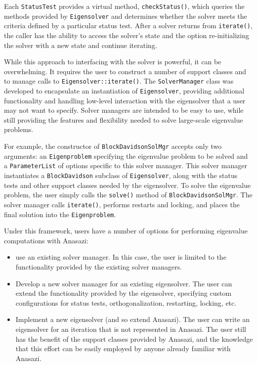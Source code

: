 \documentclass[acmtoms]{acmtrans2m}
\newcommand{\aspace}[1]{\texttt{#1}}
\begin{document}
Each \aspace{StatusTest} provides a virtual method,
\verb!checkStatus()!, which queries the methods provided by
\aspace{Eigensolver} and determines whether the solver meets the
criteria defined by a particular status test. After a solver returns
from \verb!iterate()!, the caller has the ability to access the
solver's state and the option re-initializing the solver with
a new state and continue iterating.

While this approach to interfacing with the solver is powerful, it can be overwhelming. It
requires the user to construct a number of support classes and to manage calls to
\verb!Eigensolver::iterate()!. The \aspace{SolverManager} class was developed to
encapsulate an instantiation of \aspace{Eigensolver}, providing additional functionality
and handling low-level interaction with the eigensolver that a user may not want to
specify. Solver managers are intended to be easy to use, while still providing the
features and flexibility needed to solve large-scale eigenvalue problems.

For example, the constructor of \aspace{BlockDavidsonSolMgr} accepts only two arguments:
an \aspace{Eigenproblem} specifying the eigenvalue problem to be solved and a
\texttt{ParameterList} of options specific to this solver manager. This solver manager
instantiates a \aspace{BlockDavidson} subclass of \aspace{Eigensolver}, along with the
status tests and other support classes needed by the eigensolver. To solve the eigenvalue
problem, the user simply calls the \verb!solve()! method of \aspace{BlockDavidsonSolMgr}.
The solver manager calls \verb!iterate()!, performs restarts and locking, and places the
final solution into the \aspace{Eigenproblem}.

Under this framework, users have a number of options for performing eigenvalue
computations with Anasazi:
\begin{itemize}
\item
use an existing solver manager. In this case, the user is limited to
the functionality provided by the existing solver managers.
\item
Develop a new solver manager for an existing eigensolver.
The user can extend the functionality provided by the eigensolver,
specifying custom configurations for status tests,
orthogonalization, restarting, locking,  etc.
\item
Implement a new eigensolver (and so extend Anasazi). The user can
write an eigensolver for an iteration that is not represented in
Anasazi. The user still has the benefit of the support classes
provided by Anasazi, and the knowledge that this effort can be
easily employed by anyone already familiar with Anasazi.
\end{itemize}
\end{document}
